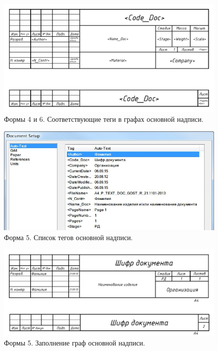 \documentclass[14pt]{extreport}
\begin{document}
\begin{figure}[h]
	\centering
	\includegraphics[width=\textwidth]{SPDS_STR_IZD_with_tagname}
	\caption{Формы 4 и 6. Соответствующие теги в графах основной надписи.\label{SPDS_STR_IZD_with_tagname}}
\end{figure}

\begin{figure}[h]
	\centering
	\includegraphics[width=\textwidth]{SPDS_TEXT_DOC}
	\caption{Форма 5. Список тегов основной надписи.\label{SPDS_TEXT_DOC}}
\end{figure}

\begin{figure}[h]
	\centering
	\includegraphics[width=\textwidth]{SPDS_TEXT_DOC_without_tagname}
	\caption{Формы 5. Заполнение граф основной надписи.\label{SPDS_TEXT_DOC_without_tagname}}
\end{figure}
\end{document}
